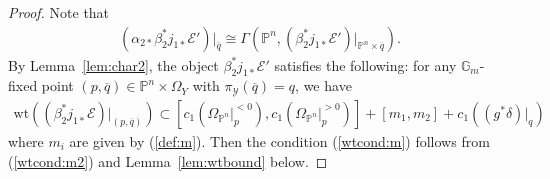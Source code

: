 \documentclass [11pt,oneside,a4paper,mathscr]{amsart}
\theoremstyle{definition}
\newcommand{\Y}{\mathcal{Y}}
\newcommand{\wt}{\mathrm{wt}}
\begin{document}
\begin{proof}
Note that 
\begin{align*}    (\alpha_{2\ast}\beta_2^{\ast}j_{1\ast}\mathcal{E}')|_{\overline{q}}\cong     \Gamma(\mathbb{P}^n, (\beta_2^{\ast}j_{1\ast}\mathcal{E}')|_{\mathbb{P}^n\times \overline{q}}).
\end{align*}
By Lemma~\ref{lem:char2}, the object 
$\beta_2^{\ast}j_{1\ast}\mathcal{E}'$ satisfies 
the following: 
for any $\mathbb{G}_m$-fixed point 
$(p, \overline{q}) \in \mathbb{P}^n \times \Omega_Y$
with $\pi_{\Y}(\overline{q})=q$, 
we have 
\begin{align}\label{wtcond:m2}
    \wt((\beta_2^{\ast}j_{1\ast}\mathcal{E})|_{(p, \overline{q})}) \subset 
     \left[c_1(\Omega_{\mathbb{P}^n}|_{p}^{<0}), c_1(\Omega_{\mathbb{P}^n}|_{p}^{>0}) \right]
     +[m_1, m_2]
     +c_1((g^*\delta)|_{q})
\end{align}
where $m_i$ are given by (\ref{def:m}).
Then the condition (\ref{wtcond:m}) follows from (\ref{wtcond:m2}) and Lemma~\ref{lem:wtbound} below. 
\end{proof}
\end{document}
